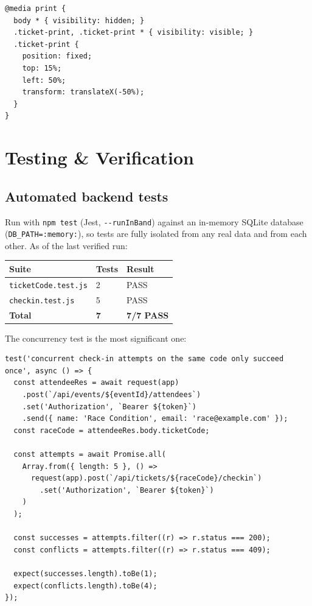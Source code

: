 ﻿\documentclass[11pt,letterpaper]{report}
\newcommand{\code}[1]{\lstinline[breaklines=true]{#1}}
\begin{document}
\begin{lstlisting}[caption={Print isolation (styles.css)}]
@media print {
  body * { visibility: hidden; }
  .ticket-print, .ticket-print * { visibility: visible; }
  .ticket-print {
    position: fixed;
    top: 15%;
    left: 50%;
    transform: translateX(-50%);
  }
}
\end{lstlisting}

\chapter{Testing \& Verification}
\label{ch:testing}

\section{Automated backend tests}
\label{sec:concurrency-test}

Run with \code{npm test} (Jest, \code{--runInBand}) against an
in-memory SQLite database (\code{DB_PATH=:memory:}), so tests are
fully isolated from any real data and from each other. As of the last
verified run:

\begin{center}
\begin{tabular}{p{6cm}p{2cm}p{4cm}}
\toprule
\textbf{Suite} & \textbf{Tests} & \textbf{Result} \\
\midrule
\code{ticketCode.test.js} & 2 & PASS \\
\code{checkin.test.js} & 5 & PASS \\
\midrule
\textbf{Total} & \textbf{7} & \textbf{7/7 PASS} \\
\bottomrule
\end{tabular}
\end{center}

The concurrency test is the most significant one:

\begin{lstlisting}[caption={checkin.test.js -- concurrent check-in race}]
test('concurrent check-in attempts on the same code only succeed once', async () => {
  const attendeeRes = await request(app)
    .post(`/api/events/${eventId}/attendees`)
    .set('Authorization', `Bearer ${token}`)
    .send({ name: 'Race Condition', email: 'race@example.com' });
  const raceCode = attendeeRes.body.ticketCode;

  const attempts = await Promise.all(
    Array.from({ length: 5 }, () =>
      request(app).post(`/api/tickets/${raceCode}/checkin`)
        .set('Authorization', `Bearer ${token}`)
    )
  );

  const successes = attempts.filter((r) => r.status === 200);
  const conflicts = attempts.filter((r) => r.status === 409);

  expect(successes.length).toBe(1);
  expect(conflicts.length).toBe(4);
});
\end{lstlisting}
\end{document}
